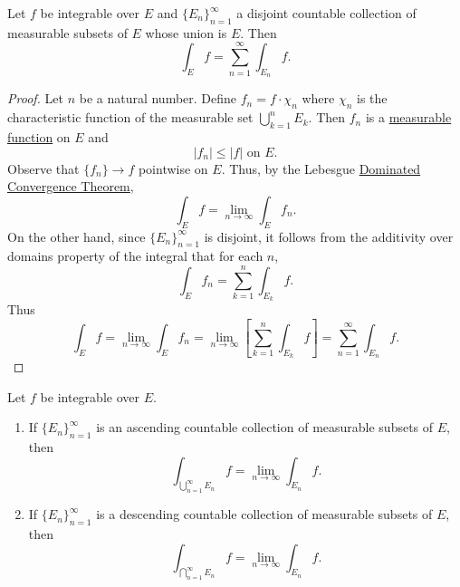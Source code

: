   \begin{theorem}
    \label{thm:countable-additivity-of-integration}
    Let $f$ be integrable over $E$ and $\{E_n\}_{n=1}^{\infty}$ a disjoint countable collection of measurable subsets of $E$ whose union is $E$. Then
    \begin{equation}
      \int_{E} f = \sum_{n=1}^{\infty} \int_{E_n} f.
    \end{equation}
  \end{theorem}
  \begin{proof}
    Let $n$ be a natural number. Define $f_n = f \cdot \chi_n$ where $\chi_n$ is the characteristic function of the measurable set $\bigcup_{k=1}^n E_k$. Then $f_n$ is a \hyperref[def:measurable-function]{measurable function} on $E$ and
    \begin{equation*}
      |f_n| \le |f| \text{ on } E.
    \end{equation*}
    Observe that $\{f_n\} \to f$ pointwise on $E$. Thus, by the Lebesgue \hyperref[thm:dominated-convergence-theorem]{Dominated Convergence Theorem},
    \begin{equation*}
      \int_{E} f = \lim_{n \to \infty} \int_{E} f_n.
    \end{equation*}
    On the other hand, since $\{E_n\}_{n=1}^{\infty}$ is disjoint, it follows from the additivity over domains property of the integral that for each $n$,
    \begin{equation*}
      \int_{E} f_n = \sum_{k=1}^{n} \int_{E_k} f.
    \end{equation*}
    Thus
    \begin{equation*}
      \int_{E} f = \lim_{n \to \infty} \int_{E} f_n = \lim_{n \to \infty} \left[ \sum_{k=1}^{n} \int_{E_k} f \right] = \sum_{n=1}^{\infty} \int_{E_n} f.
    \end{equation*}
  \end{proof}

  \begin{theorem}
    \label{thm:continuity-integration}
    Let $f$ be integrable over $E$.
    \begin{enumerate}
      \item If $\{E_n\}_{n=1}^{\infty}$ is an ascending countable collection of measurable subsets of $E$, then
      \begin{equation}
        \int_{\bigcup_{n=1}^{\infty} E_n} f = \lim_{n \to \infty} \int_{E_n} f.
      \end{equation}
      \item If $\{E_n\}_{n=1}^{\infty}$ is a descending countable collection of measurable subsets of $E$, then
      \begin{equation}
        \int_{\bigcap_{n=1}^{\infty} E_n} f = \lim_{n \to \infty} \int_{E_n} f.
      \end{equation}
    \end{enumerate}
  \end{theorem}

